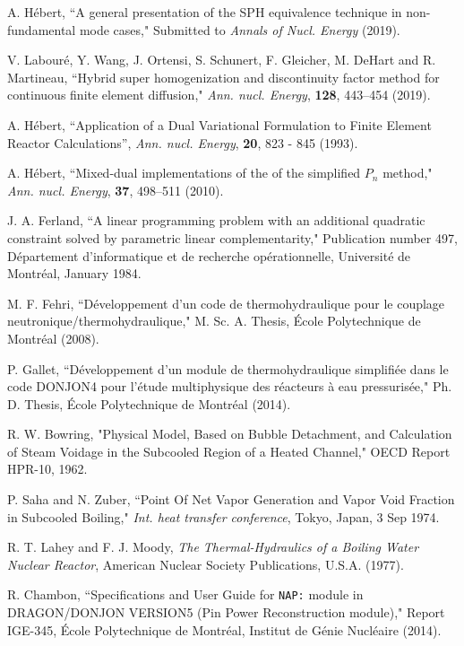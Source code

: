 \begin{thebibliography}{99}
A. H\'ebert, ``A general presentation of the SPH equivalence technique in non-fundamental mode cases," Submitted to {\sl Annals of Nucl. Energy} (2019).

V. Labour\'e, Y. Wang, J. Ortensi, S. Schunert, F. Gleicher, M. DeHart and R. Martineau, ``Hybrid super homogenization and discontinuity factor method for continuous finite element diffusion," {\sl Ann. nucl. Energy}, {\bf 128}, 443--454 (2019).

A. H\'ebert, ``Application of a Dual Variational Formulation to Finite Element Reactor Calculations'', {\sl Ann. nucl. Energy}, {\bf 20}, 823 - 845 (1993).

A. H\'ebert, ``Mixed-dual implementations of the of the simplified $P_n$ method," {\sl Ann. nucl. Energy}, {\bf 37}, 498--511 (2010).

J. A. Ferland, ``A linear programming problem with an additional
quadratic constraint solved by parametric linear complementarity,"
Publication number 497, D\'epartement d'informatique et de recherche
op\'erationnelle, Universit\'e de Montr\'eal, January 1984.

 M. F. Fehri, ``D\'eveloppement d'un code de thermohydraulique pour le couplage neutro\-nique/thermohydraulique,"
M. Sc. A. Thesis, \'Ecole Polytechnique de Montr\'eal (2008).

 P. Gallet, ``D\'eveloppement d'un module de thermohydraulique simplifi\'ee dans le code DONJON4 pour l'\'etude multiphysique
des r\'eacteurs \`a eau pressuris\'ee," Ph. D. Thesis, \'Ecole Polytechnique de Montr\'eal (2014).

R. W. Bowring, "Physical Model, Based on Bubble Detachment, and Calculation of Steam Voidage in the Subcooled
Region of a Heated Channel," OECD Report HPR-10, 1962.

P. Saha and N. Zuber, ``Point Of Net Vapor Generation and Vapor Void Fraction in Subcooled Boiling," {\sl Int. heat transfer conference}, Tokyo, Japan, 3 Sep 1974.

R. T. Lahey and F. J. Moody, {\sl The Thermal-Hydraulics of a Boiling Water Nuclear Reactor},
American Nuclear Society Publications, U.S.A. (1977).

R. Chambon, ``Specifications and User Guide for {\tt NAP:} module in DRAGON/DONJON VERSION5
(Pin Power Reconstruction module)," Report IGE-345,
\'Ecole Polytechnique de Montr\'eal,
 Institut de G\'enie Nucl\'eaire (2014).


\end{thebibliography}
